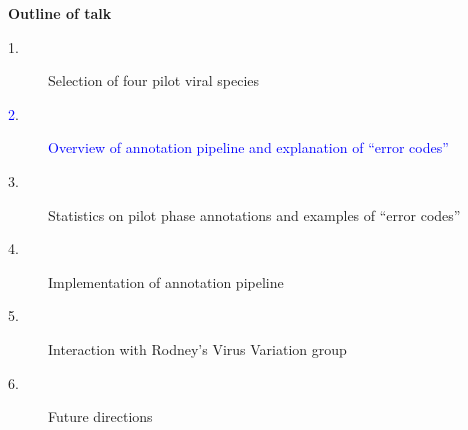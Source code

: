\documentclass[landscape]{slides}
\begin{document}
\begin{slide}
\begin{center}
\textbf{Outline of talk}

\small
\begin{description}
\item[1.] Selection of four pilot viral species
\item[\textcolor{blue}2.] \textcolor{blue}{Overview of annotation pipeline and explanation of ``error codes''}
\item[3.] Statistics on pilot phase annotations and examples of ``error codes''
\item[4.] Implementation of annotation pipeline
\item[5.] Interaction with Rodney's Virus Variation group
\item[6.] Future directions
\end{description}

\end{center}
\vfill
\end{slide}
\end{document}
